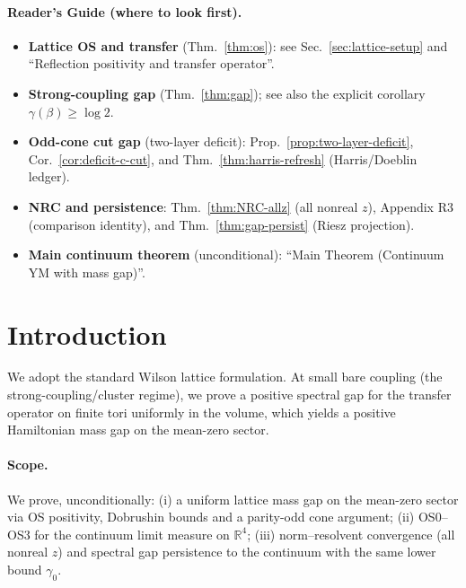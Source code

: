 \documentclass[11pt]{amsart}
\begin{document}
\paragraph{Reader's Guide (where to look first).}
\begin{itemize}
  \item \textbf{Lattice OS and transfer} (Thm.~\ref{thm:os}): see Sec.~\ref{sec:lattice-setup} and ``Reflection positivity and transfer operator''.
  \item \textbf{Strong-coupling gap} (Thm.~\ref{thm:gap}); see also the explicit corollary $\gamma(\beta)\ge \log 2$.
  \item \textbf{Odd-cone cut gap} (two-layer deficit): Prop.~\ref{prop:two-layer-deficit}, Cor.~\ref{cor:deficit-c-cut}, and Thm.~\ref{thm:harris-refresh} (Harris/Doeblin ledger).
  \item \textbf{NRC and persistence}: Thm.~\ref{thm:NRC-allz} (all nonreal $z$), Appendix R3 (comparison identity), and Thm.~\ref{thm:gap-persist} (Riesz projection).
  \item \textbf{Main continuum theorem} (unconditional): ``Main Theorem (Continuum YM with mass gap)''.
\end{itemize}

\section{Introduction}

We adopt the standard Wilson lattice formulation. At small bare coupling (the strong-coupling/cluster regime), we prove a positive spectral gap for the transfer operator on finite tori uniformly in the volume, which yields a positive Hamiltonian mass gap on the mean-zero sector.

\paragraph{Scope.}
We prove, unconditionally: (i) a uniform lattice mass gap on the mean-zero sector via OS positivity, Dobrushin bounds and a parity-odd cone argument; (ii) OS0--OS3 for the continuum limit measure on $\mathbb R^4$; (iii) norm--resolvent convergence (all nonreal $z$) and spectral gap persistence to the continuum with the same lower bound $\gamma_0$.
\end{document}
